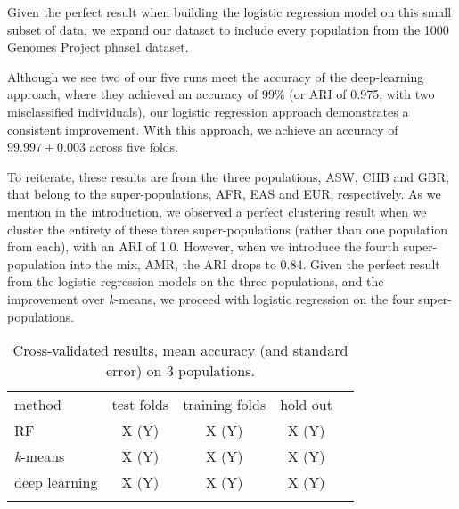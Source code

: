 \documentclass{llncs}
\newcommand{\kMeans}{\textit{k}-means}
\begin{document}
{Given the perfect result when building the logistic regression model on this small subset of data, we expand our dataset to include every population from the 1000 Genomes Project phase1 dataset.  

Although we see two of our five runs meet the accuracy of the deep-learning approach, where they achieved an accuracy of 99\% (or ARI of 0.975, with two misclassified individuals), our logistic regression approach demonstrates a consistent improvement.
With this approach, we achieve an accuracy of \(99.997 \pm 0.003\) across five folds.

To reiterate, these results are from the three populations, ASW, CHB and GBR, that belong to the super-populations, AFR, EAS and EUR, respectively.
As we mention in the introduction, we observed a perfect clustering result when we cluster the entirety of these three super-populations (rather than one population from each), with an ARI of 1.0. However, when we introduce the fourth super-population into the mix, AMR, the ARI drops to 0.84.
Given the perfect result from the logistic regression models on the three populations, and the improvement over \kMeans{}, we proceed with logistic regression on the four super-populations.  


\begin{table}
\caption{Cross-validated results, mean accuracy (and standard error) on 3 populations.}
\begin{center}
\renewcommand{\arraystretch}{1.4}
\setlength\tabcolsep{3pt}
\begin{tabular}{lcccc}
\hline\noalign{\smallskip}
method  & test folds & training folds & hold out \\
RF  & X (Y) & X (Y) & X (Y) \\
\kMeans & X (Y) & X (Y) & X (Y) \\
deep learning & X (Y) & X (Y) & X (Y) \\
\noalign{\smallskip}
\hline
\end{tabular}
\end{center}
\end{table}

}
\end{document}
